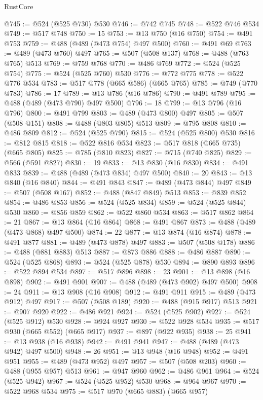 \begin{lexlean}{RustCore}
\begin{coremodule}
@745 := @524 (@525 @730) @530
@746 := @742 @745
@748 := @522 @746 @534
@749 := @517 @748
@750 := 15
@753 := @13 @750 (@16 @750)
@754 := @491 @753
@759 := @488 (@489 (@473 @754) @497 @500)
@760 := @491 @69
@763 := @489 (@473 @760) @497
@765 := @507 (@508 @137)
@768 := @488 (@763 @765) @513
@769 := @759 @768
@770 := @486 @769
@772 := @524 (@525 @754)
@775 := @524 (@525 @760) @530
@776 := @772 @775
@778 := @522 @776 @534
@783 := @517 @778 (@665 @586) (@665 @765)
@785 := @749 (@770 @783)
@786 := 17
@789 := @13 @786 (@16 @786)
@790 := @491 @789
@795 := @488 (@489 (@473 @790) @497 @500)
@796 := 18
@799 := @13 @796 (@16 @796)
@800 := @491 @799
@803 := @489 (@473 @800) @497
@805 := @507 (@508 @151)
@808 := @488 (@803 @805) @513
@809 := @795 @808
@810 := @486 @809
@812 := @524 (@525 @790)
@815 := @524 (@525 @800) @530
@816 := @812 @815
@818 := @522 @816 @534
@823 := @517 @818 (@665 @735) (@665 @805)
@825 := @785 (@810 @823)
@827 := @715 (@740 @825)
@829 := @566 (@591 @827)
@830 := 19
@833 := @13 @830 (@16 @830)
@834 := @491 @833
@839 := @488 (@489 (@473 @834) @497 @500)
@840 := 20
@843 := @13 @840 (@16 @840)
@844 := @491 @843
@847 := @489 (@473 @844) @497
@849 := @507 (@508 @167)
@852 := @488 (@847 @849) @513
@853 := @839 @852
@854 := @486 @853
@856 := @524 (@525 @834)
@859 := @524 (@525 @844) @530
@860 := @856 @859
@862 := @522 @860 @534
@863 := @517 @862
@864 := 21
@867 := @13 @864 (@16 @864)
@868 := @491 @867
@873 := @488 (@489 (@473 @868) @497 @500)
@874 := 22
@877 := @13 @874 (@16 @874)
@878 := @491 @877
@881 := @489 (@473 @878) @497
@883 := @507 (@508 @178)
@886 := @488 (@881 @883) @513
@887 := @873 @886
@888 := @486 @887
@890 := @524 (@525 @868)
@893 := @524 (@525 @878) @530
@894 := @890 @893
@896 := @522 @894 @534
@897 := @517 @896
@898 := 23
@901 := @13 @898 (@16 @898)
@902 := @491 @901
@907 := @488 (@489 (@473 @902) @497 @500)
@908 := 24
@911 := @13 @908 (@16 @908)
@912 := @491 @911
@915 := @489 (@473 @912) @497
@917 := @507 (@508 @189)
@920 := @488 (@915 @917) @513
@921 := @907 @920
@922 := @486 @921
@924 := @524 (@525 @902)
@927 := @524 (@525 @912) @530
@928 := @924 @927
@930 := @522 @928 @534
@935 := @517 @930 (@665 @552) (@665 @917)
@937 := @897 (@922 @935)
@938 := 25
@941 := @13 @938 (@16 @938)
@942 := @491 @941
@947 := @488 (@489 (@473 @942) @497 @500)
@948 := 26
@951 := @13 @948 (@16 @948)
@952 := @491 @951
@955 := @489 (@473 @952) @497
@957 := @507 (@508 @203)
@960 := @488 (@955 @957) @513
@961 := @947 @960
@962 := @486 @961
@964 := @524 (@525 @942)
@967 := @524 (@525 @952) @530
@968 := @964 @967
@970 := @522 @968 @534
@975 := @517 @970 (@665 @883) (@665 @957)

\end{coremodule}
\end{lexlean}
